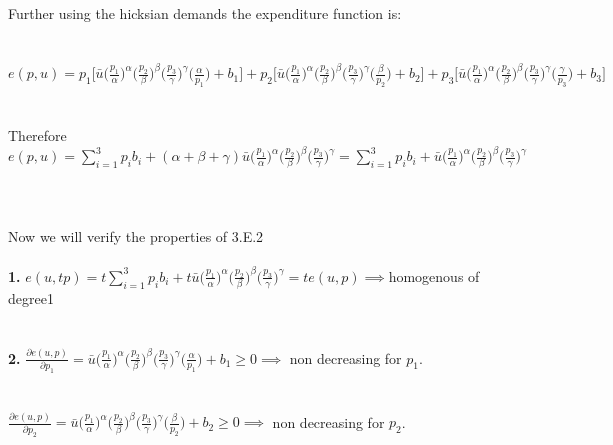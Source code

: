 \documentclass[12pt]{article}
\newenvironment{problem}[2][Problem]{\begin{trivlist}
\item[\hskip \labelsep {\bfseries #1}\hskip \labelsep {\bfseries #2.}]}{\end{trivlist}}
\newcommand\ddfrac[2]{\frac{\displaystyle #1}{\displaystyle #2}}
\begin{document}
\begin{problem}{5}
\\
\\
\\
Further using the hicksian demands the expenditure function is: 
\\
\\
\\
$e(p, u) =  p_1 \bigg[ \bar{u} \bigg(\ddfrac{p_1 }{ \alpha} \bigg)^{\alpha} \bigg(\ddfrac{ p_2}{\beta } \bigg)^\beta   \bigg(\ddfrac{p_3}{  \gamma } \bigg)^{\gamma} \bigg(\ddfrac{ \alpha}{ p_1 } \bigg) + b_1 \bigg] + p_2 \bigg[\bar{u} \bigg(\ddfrac{p_1 }{ \alpha} \bigg)^{\alpha} \bigg(\ddfrac{ p_2}{\beta } \bigg)^\beta   \bigg(\ddfrac{p_3}{  \gamma } \bigg)^{\gamma} \bigg(\ddfrac{\beta}{p_2   } \bigg) + b_2 \bigg] + p_3 \bigg[ \bar{u} \bigg(\ddfrac{p_1 }{ \alpha} \bigg)^{\alpha} \bigg(\ddfrac{ p_2}{\beta } \bigg)^\beta   \bigg(\ddfrac{p_3}{  \gamma } \bigg)^{\gamma} \bigg(\ddfrac{ \gamma }{ p_3 } \bigg) + b_3 \bigg]$
\\
\\
\\
Therefore $e(p, u) = \displaystyle \sum_{i = 1}^3 p_i b_i + (\alpha + \beta + \gamma ) \bar{u} \bigg(\ddfrac{p_1 }{ \alpha} \bigg)^{\alpha} \bigg(\ddfrac{ p_2}{\beta } \bigg)^\beta   \bigg(\ddfrac{p_3}{  \gamma } \bigg)^{\gamma}  =\displaystyle \sum_{i = 1}^3 p_i b_i + \bar{u} \bigg(\ddfrac{p_1 }{ \alpha} \bigg)^{\alpha} \bigg(\ddfrac{ p_2}{\beta } \bigg)^\beta   \bigg(\ddfrac{p_3}{  \gamma } \bigg)^{\gamma} $
\\
\\
\\
\\
Now we will verify the properties of 3.E.2
\\
\\
\textbf{1.} $e(u, t p)= \displaystyle t \sum_{i = 1}^3 p_i b_i + t \bar{u} \bigg(\ddfrac{p_1 }{ \alpha} \bigg)^{\alpha} \bigg(\ddfrac{ p_2}{\beta } \bigg)^\beta   \bigg(\ddfrac{p_3}{  \gamma } \bigg)^{\gamma}  = t e(u, p) \implies $homogenous of degree1 
\\
\\
\\
\textbf{2.} $\ddfrac{\partial e(u, p)}{\partial p_1} = \bar{u} \bigg(\ddfrac{p_1 }{ \alpha} \bigg)^{\alpha} \bigg(\ddfrac{ p_2}{\beta } \bigg)^\beta   \bigg(\ddfrac{p_3}{  \gamma } \bigg)^{\gamma} \bigg(\ddfrac{ \alpha}{ p_1 } \bigg) + b_1  \geq 0 \implies $ non decreasing for $p_1$. 
\\
\\
\\
$\ddfrac{\partial e(u, p)}{\partial p_2} = \bar{u} \bigg(\ddfrac{p_1 }{ \alpha} \bigg)^{\alpha} \bigg(\ddfrac{ p_2}{\beta } \bigg)^\beta   \bigg(\ddfrac{p_3}{  \gamma } \bigg)^{\gamma} \bigg(\ddfrac{ \beta}{ p_2 } \bigg) + b_2  \geq 0 \implies $ non decreasing for $p_2$. 

\end{problem}
\end{document}

